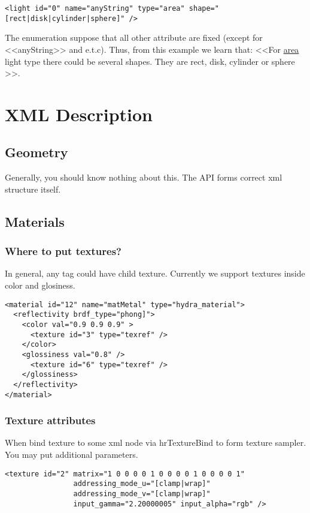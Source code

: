 \documentclass[a4paper,11pt]{report}
\begin{document}
\lstset{language=XML}
\begin{lstlisting}
<light id="0" name="anyString" type="area" shape="[rect|disk|cylinder|sphere]" />
\end{lstlisting}

 The enumeration suppose that all other attribute are fixed (except for <<anyString>> and e.t.c). Thus, from this example we learn that: <<For \underline{area} light type there could be several shapes. They are rect, disk, cylinder or sphere >>.

\chapter{XML Description}

\section{Geometry}

Generally, you should know nothing about this. The API forms correct xml structure itself.

\section{Materials}

\subsection{Where to put textures?}

In general, any tag could have child texture. Currently we support textures inside color and glosiness.

\lstset{language=XML}
\begin{lstlisting}
<material id="12" name="matMetal" type="hydra_material">
  <reflectivity brdf_type="phong]">
    <color val="0.9 0.9 0.9" >
      <texture id="3" type="texref" />
    </color>
    <glossiness val="0.8" />
      <texture id="6" type="texref" />
    </glossiness>    
  </reflectivity>
</material>
\end{lstlisting}

\subsection{Texture attributes}

When bind texture to some xml node via hrTextureBind to form texture sampler. You may put additional parameters.

\lstset{language=XML}
\begin{lstlisting}
<texture id="2" matrix="1 0 0 0 0 1 0 0 0 0 1 0 0 0 0 1" 
                addressing_mode_u="[clamp|wrap]" 
                addressing_mode_v="[clamp|wrap]" 
                input_gamma="2.20000005" input_alpha="rgb" />
\end{lstlisting}
\end{document}
